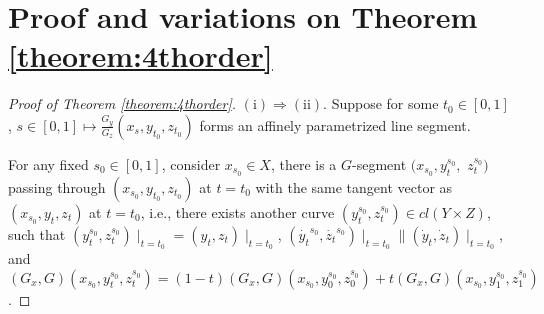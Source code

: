 

\section{Proof and variations on Theorem \ref{theorem:4thorder}}\label{A:4thorder}




\begin{proof}[Proof of Theorem \ref{theorem:4thorder}]
	$\mathrm{(i)}\Rightarrow \mathrm{(ii)}.$ Suppose for some $t_0 \in [0,1]$, $s \in [0,1] \longmapsto \frac{G_y}{G_z}(x_s, y_{t_0}, z_{t_0})$ forms an affinely parametrized line segment.
	
	For any fixed $s_0\in [0,1]$, consider $x_{s_0}\in X$, there is a $G$-segment $(x_{s_0}, y_t^{s_0},$ $ z_t^{s_0})$ passing through $(x_{s_0}, y_{t_0}, z_{t_0})$ at $t=t_0$ with the same tangent vector as $(x_{s_0}, y_t, z_t)$ at $t=t_0$, i.e., there exists
	another curve $(y_t^{s_0}, z_t^{s_0}) \in cl( Y \times Z)$, such that $(y_t^{s_0},z_t^{s_0})\mid _{t=t_0} = (y_t,z_t)\mid _{t=t_0}$,  $(\dot{y_t}^{s_0},\dot{z_t}^{s_0})\mid _{t=t_0} \parallel (\dot{y}_t,\dot{z}_t)\mid _{t=t_0}$, and $(G_x, G)(x_{s_0},y_t^{s_0},z_t^{s_0}) = (1-t)(G_x, G)(x_{s_0},y_0^{s_0},z_0^{s_0})+t (G_x, G)(x_{s_0},y_1^{s_0},z_1^{s_0})$. 
	

\end{proof}
